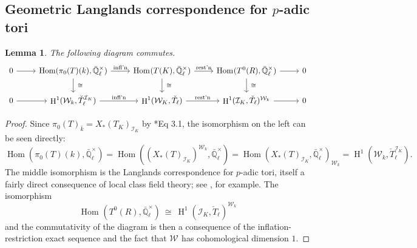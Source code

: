\documentclass[10pt]{amsart}
\theoremstyle{plain}
\newtheorem{lemma}[theorem]{Lemma}
\theoremstyle{definition}
\newcommand{\EE}{\mathbb{\bar Q}_\ell}
\newcommand{\bFq}{\bar{k}}
\newcommand{\Fq}{k}
\newcommand{\EEx}{\EE^\times}
\newcommand{\Weil}[1]{\mathcal{W}_{#1}}
\DeclareMathOperator{\Hom}{Hom}
\DeclareMathOperator{\Hh}{H}
\newcommand{\iso}{{\ \cong\ }}
\begin{document}
\subsection{Geometric Langlands correspondence for $p$-adic tori}\label{ssec:LLCT}

\begin{lemma}\label{lem:LLCT}
The following diagram commutes. 
\[
\begin{tikzcd}
   0 \arrow{r} & \Hom(\pi_0(T)(\Fq), \EEx) \arrow{r}{\text{infl'n}} \arrow{d}{\iso}
    & \arrow{d}{\iso} \Hom_\text{}(T(K),\EEx) \arrow{r}{\text{rest'n}} & \Hom_\text{}(T^0(R),\EEx) \arrow{r} \arrow{d}{\iso} & 0\\    
    0 \arrow{r}  
 & \Hh^1(\Weil{\Fq}, \check{T}_\ell^{\mathcal{I}_K}) \arrow{r}{\text{infl'n}}
 & \Hh^1(\Weil{K}, \check{T}_\ell) \arrow{r}{\text{rest'n}} 
 & \Hh^1(\mathcal{I}_K, \check{T}_\ell)^{\Weil{\Fq}} \arrow{r}  
 & 0
\end{tikzcd}
\] 
\end{lemma}
\begin{proof}
Since $\pi_0(T)_{\bFq} = X_*(T_K)_{\mathcal{I}_K}$ by \cite{bitan:discriminant}*{Eq 3.1}, the isomorphism on the left can be seen directly:
\[\Hom(\pi_0(T)(\Fq), \EEx)
= \Hom((X_*(T)_{\mathcal{I}_K})^{\Weil{\Fq}}, \EEx)
= \Hom(X_*(T)_{\mathcal{I}_K}, \EEx)_{\Weil{\Fq}} 
= \Hh^1(\Weil{\Fq}, \check{T}_\ell^{\mathcal{I}_K}).
\]
The middle isomorphism is the Langlands correspondence for $p$-adic tori, itself a fairly direct consequence of local class field theory; see \cite{yu:09a}, for example. The isomorphism 
\[
\Hom_\text{}(T^0(R),\EEx) \iso \Hh^1(\mathcal{I}_K, \check{T}_\ell)^{\Weil{\Fq}}
\] 
and the commutativity of the diagram is then a consequence of the inflation-restriction exact sequence and the fact that $\Weil{}$ has cohomological dimension $1$.
\end{proof}
\end{document}

